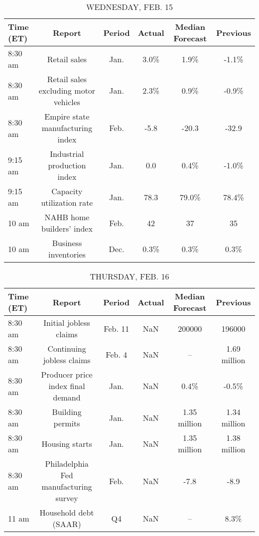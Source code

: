 \documentclass{article}%
\begin{document}
%


\begin{table}[htbp]%
\caption{WEDNESDAY, FEB. 15}%
\centering%
\begin{adjustbox}{width=1\textwidth}%
\begin{tabular}{lccccc}
\toprule
Time (ET) &                                Report & Period & Actual & Median Forecast & Previous \\
\midrule
  8:30 am &                          Retail sales &   Jan. &   3.0\% &            1.9\% &    -1.1\% \\
  8:30 am & Retail sales excluding motor vehicles &   Jan. &   2.3\% &            0.9\% &    -0.9\% \\
  8:30 am &      Empire state manufacturing index &   Feb. &   -5.8 &           -20.3 &    -32.9 \\
  9:15 am &           Industrial production index &   Jan. &    0.0 &            0.4\% &    -1.0\% \\
  9:15 am &             Capacity utilization rate &   Jan. &   78.3 &           79.0\% &    78.4\% \\
    10 am &             NAHB home builders' index &   Feb. &     42 &              37 &       35 \\
    10 am &                  Business inventories &   Dec. &   0.3\% &            0.3\% &     0.3\% \\
\bottomrule
\end{tabular}
%
\end{adjustbox}%
\end{table}

%


\begin{table}[htbp]%
\caption{THURSDAY, FEB. 16}%
\centering%
\begin{adjustbox}{width=1\textwidth}%
\begin{tabular}{lccccc}
\toprule
Time (ET) &                                Report &  Period & Actual & Median Forecast &     Previous \\
\midrule
  8:30 am &                Initial jobless claims & Feb. 11 &    NaN &          200000 &       196000 \\
  8:30 am &             Continuing jobless claims &  Feb. 4 &    NaN &              -- & 1.69 million \\
  8:30 am &     Producer price index final demand &    Jan. &    NaN &            0.4\% &        -0.5\% \\
  8:30 am &                      Building permits &    Jan. &    NaN &    1.35 million & 1.34 million \\
  8:30 am &                        Housing starts &    Jan. &    NaN &    1.35 million & 1.38 million \\
  8:30 am & Philadelphia Fed manufacturing survey &    Feb. &    NaN &            -7.8 &         -8.9 \\
    11 am &                 Household debt (SAAR) &      Q4 &    NaN &              -- &         8.3\% \\
\bottomrule
\end{tabular}
%
\end{adjustbox}%
\end{table}
\end{document}
